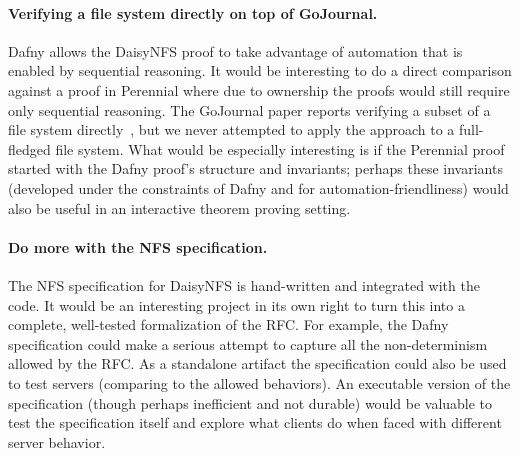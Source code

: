 \paragraph{Verifying a file system directly on top of GoJournal.} Dafny allows
the DaisyNFS proof to take advantage of automation that is enabled by sequential
reasoning. It would be interesting to do a direct comparison against a proof in
Perennial where due to ownership the proofs would still require only sequential
reasoning. The GoJournal paper reports verifying a subset of a file system
directly~\cite{chajed:gojournal}, but we never attempted to apply the approach
to a full-fledged file system. What would be especially interesting is if the
Perennial proof started with the Dafny proof's structure and invariants; perhaps
these invariants (developed under the constraints of Dafny and for
automation-friendliness) would also be useful in an interactive theorem proving
setting.

\paragraph{Do more with the NFS specification.} The NFS specification for
DaisyNFS is hand-written and integrated with the code. It would be an
interesting project in its own right to turn this into a complete, well-tested
formalization of the RFC. For example, the Dafny specification could make a serious
attempt to capture all the non-determinism allowed by the RFC. As a standalone
artifact the specification could also be used to test servers (comparing to the
allowed behaviors). An executable version of the specification (though perhaps
inefficient and not durable) would be valuable to test the specification itself
and explore what clients do when faced with different server behavior.
